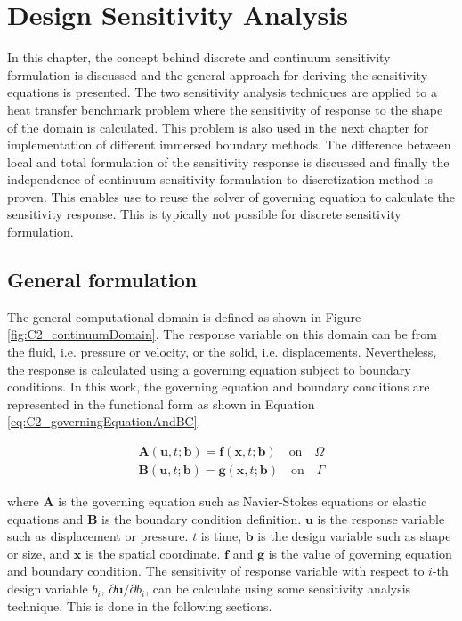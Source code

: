 \chapter{Design Sensitivity Analysis}
In this chapter, the concept behind discrete and continuum sensitivity formulation is discussed and the general approach for deriving the sensitivity equations is presented. The two sensitivity analysis techniques are applied to a heat transfer benchmark problem where the sensitivity of response to the shape of the domain is calculated. This problem is also used in the next chapter for implementation of different immersed boundary methods. The difference between local and total formulation of the sensitivity response is discussed and finally the independence of continuum sensitivity formulation to discretization method is proven. This enables use to reuse the solver of governing equation to calculate the sensitivity response. This is typically not possible for discrete sensitivity formulation.

\section{General formulation}
The general computational domain is defined as shown in Figure \ref{fig:C2_continuumDomain}. The response variable on this domain can be from the fluid, i.e. pressure or velocity, or the solid, i.e. displacements. Nevertheless, the response is calculated using a governing equation subject to boundary conditions. In this work, the governing equation and boundary conditions are represented in the functional form as shown in Equation \eqref{eq:C2_governingEquationAndBC}.

\begin{subequations}
\begin{gather}
	\mathbf{A}(\mathbf{u}, t; \mathbf{b}) = \mathbf{f}(\mathbf{x}, t; \mathbf{b})
	\quad \text{on} \quad \Omega
	\\
	\mathbf{B}(\mathbf{u}, t; \mathbf{b}) = \mathbf{g}(\mathbf{x}, t; \mathbf{b})	
	\quad \text{on} \quad \Gamma
\end{gather}\label{eq:C2_governingEquationAndBC}
\end{subequations}

where $\mathbf{A}$ is the governing equation such as Navier-Stokes equations or elastic equations and $\mathbf{B}$ is the boundary condition definition. $\mathbf{u}$ is the response variable such as displacement or pressure. $t$ is time, $\mathbf{b}$ is the design variable such as shape or size, and $\mathbf{x}$ is the spatial coordinate. $\mathbf{f}$ and $\mathbf{g}$ is the value of governing equation and boundary condition. The sensitivity of response variable with respect to $i$-th design variable $b_i$, $\partial \mathbf{u}/\partial b_i$, can be calculate using some sensitivity analysis technique. This is done in the following sections.

